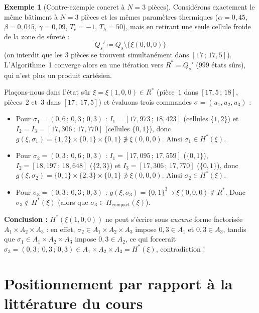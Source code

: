 \documentclass[11pt,a4paper]{article}
\theoremstyle{definition}
\newtheorem{exemple}{Exemple}
\theoremstyle{plain}
\begin{document}
\begin{exemple}[Contre-exemple concret à $N = 3$ pièces]
Considérons exactement le même bâtiment à $N = 3$ pièces et les mêmes paramètres thermiques ($\alpha = 0{,}45$, $\beta = 0{,}045$, $\gamma = 0{,}09$, $T_e = -1$, $T_h = 50$), mais en retirant une seule cellule froide de la zone de sûreté :
\[
  Q_s' \coloneqq Q_s \setminus \bigl\{\xi(0,0,0)\bigr\}
\]
(on interdit que les $3$ pièces se trouvent simultanément dans $[17\,;\,17{,}5]$). L'Algorithme~1 converge alors en une itération vers $R^* = Q_s'$ ($999$ états sûrs), qui n'est plus un produit cartésien.

Plaçons-nous dans l'état sûr $\xi = \xi(1, 0, 0) \in R^*$ (pièce~$1$ dans $[17{,}5\,;\,18]$, pièces~$2$ et~$3$ dans $[17\,;\,17{,}5]$) et évaluons trois commandes $\sigma = (u_1, u_2, u_3)$ :
\begin{itemize}[nosep]
  \item Pour $\sigma_1 = (0{,}6\,;\, 0{,}3\,;\, 0{,}3)$ : $I_1 = [17{,}973\,;\, 18{,}423]$ (cellules $\{1,2\}$) et $I_2 = I_3 = [17{,}306\,;\, 17{,}770]$ (cellules $\{0,1\}$), donc $g(\xi, \sigma_1) = \{1,2\} \times \{0,1\} \times \{0,1\} \not\ni \xi(0,0,0)$. Ainsi $\sigma_1 \in H^*(\xi)$.
  \item Pour $\sigma_2 = (0{,}3\,;\, 0{,}6\,;\, 0{,}3)$ : $I_1 = [17{,}095\,;\, 17{,}559]$ ($\{0,1\}$), $I_2 = [18{,}197\,;\, 18{,}648]$ ($\{2,3\}$) et $I_3 = [17{,}306\,;\, 17{,}770]$ ($\{0,1\}$), donc $g(\xi, \sigma_2) = \{0,1\} \times \{2,3\} \times \{0,1\} \not\ni \xi(0,0,0)$. Ainsi $\sigma_2 \in H^*(\xi)$.
  \item Pour $\sigma_3 = (0{,}3\,;\, 0{,}3\,;\, 0{,}3)$ : $g(\xi, \sigma_3) = \{0,1\}^3 \ni \xi(0,0,0) \notin R^*$. Donc $\sigma_3 \notin H^*(\xi)$ (alors que $\sigma_3 \in H_{\mathrm{compact}}(\xi)$).
\end{itemize}
\textbf{Conclusion :} $H^*(\xi(1,0,0))$ ne peut s'écrire sous \emph{aucune} forme factorisée $A_1 \times A_2 \times A_3$ : en effet, $\sigma_2 \in A_1 \times A_2 \times A_3$ impose $0{,}3 \in A_1$ et $0{,}3 \in A_3$, tandis que $\sigma_1 \in A_1 \times A_2 \times A_3$ impose $0{,}3 \in A_2$, ce qui forcerait $\sigma_3 = (0{,}3\,;\, 0{,}3\,;\, 0{,}3) \in A_1 \times A_2 \times A_3 = H^*(\xi)$, contradiction !
\end{exemple}

\section{Positionnement par rapport à la littérature du cours}
\end{document}
